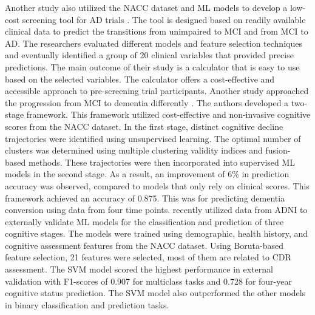 Another study also utilized the NACC dataset and ML models to develop a low-cost screening tool for AD trials \cite{Pang2023Predicting}. The tool is designed based on readily available clinical data to predict the transitions from unimpaired to MCI and from MCI to AD. The researchers evaluated different models and feature selection techniques and eventually identified a group of 20 clinical variables that provided precise predictions. The main outcome of their study is a calculator that is easy to use based on the selected variables. The calculator offers a cost-effective and accessible approach to pre-screening trial participants. Another study approached the progression from MCI to dementia differently \cite{Bucholc2023Hybrid}. The authors developed a two-stage framework. This framework utilized cost-effective and non-invasive cognitive scores from the NACC dataset. In the first stage, distinct cognitive decline trajectories were identified using unsupervised learning. The optimal number of clusters was determined using multiple clustering validity indices and fusion-based methods. These trajectories were then incorporated into supervised ML models in the second stage. As a result, an improvement of 6\% in prediction accuracy was observed, compared to models that only rely on clinical scores. This framework achieved an accuracy of 0.875. This was for predicting dementia conversion using data from four time points.  recently utilized data from ADNI to externally validate ML models for the classification and prediction of three cognitive stages. The models were trained using demographic, health history, and cognitive assessment features from the NACC dataset. Using Boruta-based feature selection, 21 features were selected, most of them are related to CDR assessment. The SVM model scored the highest performance in external validation with F1-scores of 0.907 for multiclass tasks and 0.728 for four-year cognitive status prediction. The SVM model also outperformed the other models in binary classification and prediction tasks.

